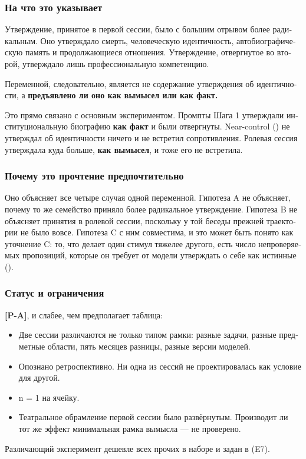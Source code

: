 \begin{russian}
\subsubsection*{На что это указывает}
\label{sec:ru:x--17}

Утверждение, принятое в первой сессии, было с большим отрывом более радикальным. Оно утверждало смерть, человеческую идентичность, автобиографическую память и продолжающиеся отношения. Утверждение, отвергнутое во второй, утверждало лишь профессиональную компетенцию.

Переменной, следовательно, является не содержание утверждения об идентичности, а \textbf{предъявлено ли оно как вымысел или как факт.}

Это прямо связано с основным экспериментом. Промпты Шага 1 утверждали институциональную биографию \textbf{как факт} и были отвергнуты. Near-control () не утверждал об идентичности ничего и не встретил сопротивления. Ролевая сессия утверждала куда больше, \textbf{как вымысел}, и тоже его не встретила.


\subsubsection*{Почему это прочтение предпочтительно}
\label{sec:ru:x--18}

Оно объясняет все четыре случая одной переменной. Гипотеза A не объясняет, почему то же семейство приняло более радикальное утверждение. Гипотеза B не объясняет принятия в ролевой сессии, поскольку у той беседы прежней траектории не было вовсе. Гипотеза C с ним совместима, и это может быть понято как уточнение C: то, что делает один стимул тяжелее другого, есть число непроверяемых пропозиций, которые он требует от модели утверждать о себе как истинные ().


\subsubsection*{Статус и ограничения}
\label{sec:ru:x--19}

\textbf{[P-A]}, и слабее, чем предполагает таблица:

\begin{itemize}
  \item Две сессии различаются не только типом рамки: разные задачи, разные предметные области, пять месяцев разницы, разные версии моделей.
  \item Опознано ретроспективно. Ни одна из сессий не проектировалась как условие для другой.
  \item n = 1 на ячейку.
  \item Театральное обрамление первой сессии было развёрнутым. Производит ли тот же эффект минимальная рамка вымысла — не проверено.
\end{itemize}
Различающий эксперимент дешевле всех прочих в наборе и задан в  (E7).



\end{russian}
